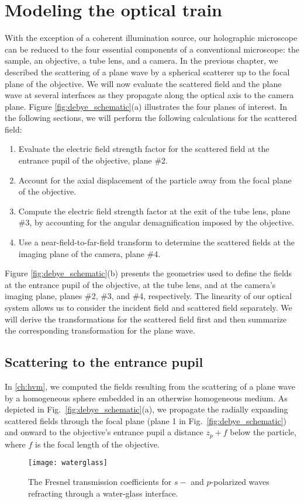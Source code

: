 \section{Modeling the optical train}

With the exception of a coherent illumination source, our holographic microscope
can be reduced to the four essential components of a conventional microscope:
the sample, an objective, a tube lens, and a camera. In the previous chapter,
we described the scattering of a plane wave by a spherical scatterer up to
the focal plane of the objective. We will now evaluate the scattered field and
the plane wave at several interfaces as they propagate along the optical axis
to the camera plane. Figure \ref{fig:debye_schematic}(a) illustrates the four planes
of interest. In the following sections, we will perform the following calculations
for the scattered field:
\begin{enumerate}
\item Evaluate the electric field strength factor for the scattered field at
  the entrance pupil of the objective, plane \#\num{2}.
\item Account for the axial displacement of the particle away from the focal
  plane of the objective.
\item Compute the electric field strength factor at the exit of the tube lens, plane \#3,
  by accounting for the angular demagnification imposed by the objective.
\item Use a near-field-to-far-field transform to determine the scattered
  fields at the imaging plane of the camera, plane \#4.
\end{enumerate}
Figure \ref{fig:debye_schematic}(b) presents the geometries used to define the
fields at the entrance pupil of the objective, at the tube lens, and at the camera's
imaging plane, planes \#\num{2}, \#\num{3}, and \#\num{4}, respectively.
The linearity of our optical system allows us to consider the incident field
and scattered field separately. We will derive the transformations for the
scattered field first and then summarize the corresponding transformation for the
plane wave.

\subsection{Scattering to the entrance pupil}

In \autoref{ch:hvm}, we computed the fields resulting from the scattering of
a plane wave by a homogeneous sphere embedded in an otherwise
homogeneous medium. As depicted in Fig.~\ref{fig:debye_schematic}(a), we
propagate the radially expanding scattered fields through the focal plane (plane \num{1} in
Fig.~\ref{fig:debye_schematic}) and onward to the objective's entrance pupil a distance
$z_p + f$ below the particle, where $f$ is the focal length of the objective.
\begin{figure}
  \centering
  \texttt{[image: waterglass]}
  \caption{The Fresnel transmission coefficients for $s-$ and $p$-polarized
  waves refracting through a water-glass interface.}
  \label{fig:waterglass}
\end{figure}

